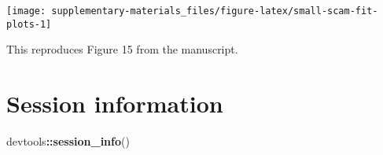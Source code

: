\documentclass[12pt,]{article}
\newenvironment{Shaded}{\begin{snugshade}}{\end{snugshade}}
\newcommand{\KeywordTok}[1]{\textcolor[rgb]{0.13,0.29,0.53}{\textbf{#1}}}
\newcommand{\NormalTok}[1]{#1}
\newcommand{\OperatorTok}[1]{\textcolor[rgb]{0.81,0.36,0.00}{\textbf{#1}}}
\begin{document}
\begin{center}\texttt{[image: supplementary-materials\_files/figure-latex/small-scam-fit-plots-1]} \end{center}

This reproduces Figure 15 from the manuscript.

\hypertarget{session-information}{%
\section{Session information}\label{session-information}}

\begin{Shaded}
\begin{Highlighting}[]
\NormalTok{devtools}\OperatorTok{::}\KeywordTok{session_info}\NormalTok{()}
\end{Highlighting}
\end{Shaded}
\end{document}
